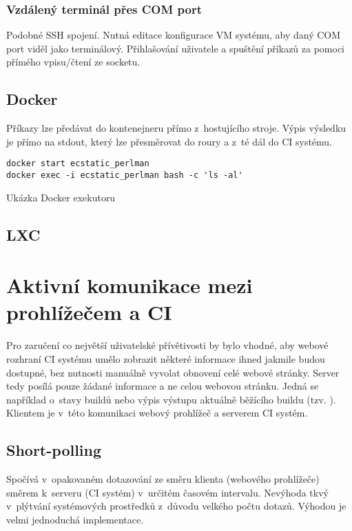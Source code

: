 \subsubsection{Vzdálený terminál přes COM port}

Podobné SSH spojení.
Nutná editace konfigurace VM systému, aby daný COM port viděl jako terminálový.
Přihlašování uživatele a spuštění příkazů za pomoci přímého vpisu/čtení ze socketu.

\subsection{Docker}

Příkazy lze předávat do kontenejneru přímo z~hostujícího stroje.
Výpis výsledku je přímo na stdout, který lze přesměrovat do roury a z~té dál do CI systému.

\begin{listing}[ht]
\begin{verbatim}
docker start ecstatic_perlman
docker exec -i ecstatic_perlman bash -c 'ls -al' 
\end{verbatim}
\caption{Ukázka Docker exekutoru}
\label{docker-minimal-example}
\end{listing}

\subsection{LXC}

\section{Aktivní komunikace mezi prohlížečem a CI}

Pro zaručení co největší uživatelské přívětivosti by bylo vhodné, aby webové rozhraní CI systému umělo zobrazit některé informace ihned jakmile budou dostupné, bez nutnosti manuálně vyvolat obnovení celé webové stránky.
Server tedy posílá pouze žádané informace a ne celou webovou stránku.
Jedná se například o~stavy buildů nebo výpis výstupu aktuálně běžícího buildu (tzv. ).
Klientem je v~této komunikaci webový prohlížeč a serverem CI systém.

\subsection{Short-polling}

Spočívá v~opakovaném dotazování ze směru klienta (webového prohlížeče) směrem k~serveru (CI systém) v~určitém časovém intervalu.
Nevýhoda tkvý v~plýtvání systémových prostředků z~důvodu velkého počtu dotazů.
Výhodou je velmi jednoduchá implementace.

